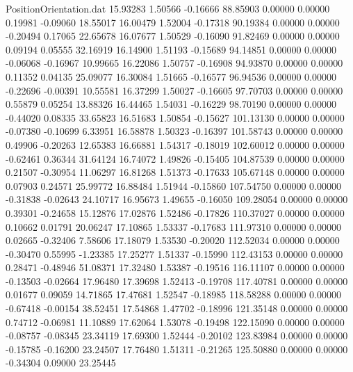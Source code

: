 \begin{filecontents}{PositionOrientation.dat}
  15.93283    1.50566   -0.16666    88.85903    0.00000    0.00000    0.19981   -0.09060   18.55017
  16.00479    1.52004   -0.17318    90.19384    0.00000    0.00000   -0.20494    0.17065   22.65678
  16.07677    1.50529   -0.16090    91.82469    0.00000    0.00000    0.09194    0.05555   32.16919
  16.14900    1.51193   -0.15689    94.14851    0.00000    0.00000   -0.06068   -0.16967   10.99665
  16.22086    1.50757   -0.16908    94.93870    0.00000    0.00000    0.11352    0.04135   25.09077
  16.30084    1.51665   -0.16577    96.94536    0.00000    0.00000   -0.22696   -0.00391   10.55581
  16.37299    1.50027   -0.16605    97.70703    0.00000    0.00000    0.55879    0.05254   13.88326
  16.44465    1.54031   -0.16229    98.70190    0.00000    0.00000   -0.44020    0.08335   33.65823
  16.51683    1.50854   -0.15627   101.13130    0.00000    0.00000   -0.07380   -0.10699    6.33951
  16.58878    1.50323   -0.16397   101.58743    0.00000    0.00000    0.49906   -0.20263   12.65383
  16.66881    1.54317   -0.18019   102.60012    0.00000    0.00000   -0.62461    0.36344   31.64124
  16.74072    1.49826   -0.15405   104.87539    0.00000    0.00000    0.21507   -0.30954   11.06297
  16.81268    1.51373   -0.17633   105.67148    0.00000    0.00000    0.07903    0.24571   25.99772
  16.88484    1.51944   -0.15860   107.54750    0.00000    0.00000   -0.31838   -0.02643   24.10717
  16.95673    1.49655   -0.16050   109.28054    0.00000    0.00000    0.39301   -0.24658   15.12876
  17.02876    1.52486   -0.17826   110.37027    0.00000    0.00000    0.10662    0.01791   20.06247
  17.10865    1.53337   -0.17683   111.97310    0.00000    0.00000    0.02665   -0.32406    7.58606
  17.18079    1.53530   -0.20020   112.52034    0.00000    0.00000   -0.30470    0.55995   -1.23385
  17.25277    1.51337   -0.15990   112.43153    0.00000    0.00000    0.28471   -0.48946   51.08371
  17.32480    1.53387   -0.19516   116.11107    0.00000    0.00000   -0.13503   -0.02664   17.96480
  17.39698    1.52413   -0.19708   117.40781    0.00000    0.00000    0.01677    0.09059   14.71865
  17.47681    1.52547   -0.18985   118.58288    0.00000    0.00000   -0.67418   -0.00154   38.52451
  17.54868    1.47702   -0.18996   121.35148    0.00000    0.00000    0.74712   -0.06981   11.10889
  17.62064    1.53078   -0.19498   122.15090    0.00000    0.00000   -0.08757   -0.08345   23.34119
  17.69300    1.52444   -0.20102   123.83984    0.00000    0.00000   -0.15785   -0.16200   23.24507
  17.76480    1.51311   -0.21265   125.50880    0.00000    0.00000   -0.34304    0.09000   23.25445

\end{filecontents}
